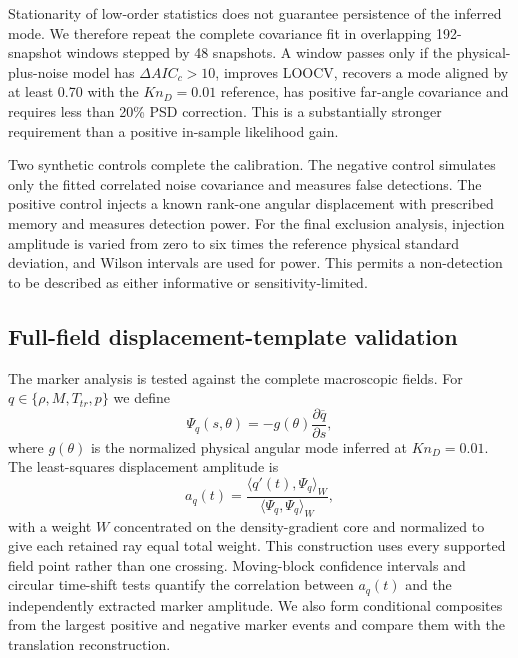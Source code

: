 \documentclass[paper]{JFM-FLM_Au}
\newcommand{\KnD}{Kn_D}
\newcommand{\mean}[1]{\overline{#1}}
\begin{document}
Stationarity of low-order statistics does not guarantee persistence of the inferred mode. We therefore repeat the complete covariance fit in overlapping 192-snapshot windows stepped by 48 snapshots. A window passes only if the physical-plus-noise model has $\Delta AIC_c>10$, improves LOOCV, recovers a mode aligned by at least 0.70 with the $\KnD=0.01$ reference, has positive far-angle covariance and requires less than 20\% PSD correction. This is a substantially stronger requirement than a positive in-sample likelihood gain.

Two synthetic controls complete the calibration. The negative control simulates only the fitted correlated noise covariance and measures false detections. The positive control injects a known rank-one angular displacement with prescribed memory and measures detection power. For the final exclusion analysis, injection amplitude is varied from zero to six times the reference physical standard deviation, and Wilson intervals are used for power. This permits a non-detection to be described as either informative or sensitivity-limited.

\subsection{Full-field displacement-template validation}
The marker analysis is tested against the complete macroscopic fields. For $q\in\{\rho,M,T_{tr},p\}$ we define
\begin{equation}
 \Psi_q(s,\theta)=-g(\theta)\frac{\partial \mean q}{\partial s},
 \label{eq:template}
\end{equation}
where $g(\theta)$ is the normalized physical angular mode inferred at $\KnD=0.01$. The least-squares displacement amplitude is
\begin{equation}
 a_q(t)=\frac{\langle q'(t),\Psi_q\rangle_W}{\langle \Psi_q,\Psi_q\rangle_W},
 \label{eq:amplitude}
\end{equation}
with a weight $W$ concentrated on the density-gradient core and normalized to give each retained ray equal total weight. This construction uses every supported field point rather than one crossing. Moving-block confidence intervals and circular time-shift tests quantify the correlation between $a_q(t)$ and the independently extracted marker amplitude. We also form conditional composites from the largest positive and negative marker events and compare them with the translation reconstruction.
\end{document}
